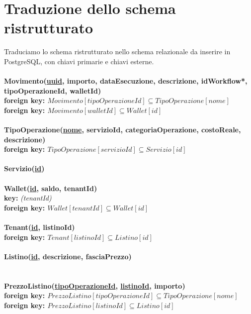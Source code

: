 \section{Traduzione dello schema ristrutturato}
Traduciamo lo schema ristrutturato nello schema relazionale da inserire in PostgreSQL, con chiavi primarie e chiavi esterne.
\\\\
\textbf{Movimento(\underline{uuid}, importo, dataEsecuzione, descrizione, idWorkflow*, tipoOperazioneId, walletId) \\}
\textbf{\hspace*{1.5 cm} foreign key: $ Movimento[tipoOperazioneId] \subseteq TipoOperazione[nome] $} \\
\textbf{\hspace*{1.5 cm} foreign key: $ Movimento[walletId] \subseteq Wallet[id] $ }
\\\\
\textbf{TipoOperazione(\underline{nome}, servizioId, categoriaOperazione, costoReale, descrizione) \\}
\textbf{\hspace*{1.5 cm} foreign key: $ TipoOperazione[servizioId] \subseteq Servizio[id] $}
\\\\
\textbf{Servizio(\underline{id})}
\\\\
\textbf{Wallet(\underline{id}, saldo, tenantId) \\}
\textbf{\hspace*{1.5 cm} key:} \textit{(tenantId)} \\
\textbf{\hspace*{1.5 cm} foreign key: $ Wallet[tenantId] \subseteq Wallet[id] $}
\\\\
\textbf{Tenant(\underline{id}, listinoId) \\}
\textbf{\hspace*{1.5 cm} foreign key: $ Tenant[listinoId] \subseteq Listino[id] $}
\\\\
\textbf{Listino(\underline{id}, descrizione, fasciaPrezzo) \\}
\\\\
\textbf{PrezzoListino(\underline{tipoOperazioneId}, \underline{listinoId}, importo) \\}
\textbf{\hspace*{1.5 cm} foreign key: $ PrezzoListino[tipoOperazioneId] \subseteq TipoOperazione[nome] $} \\
\textbf{\hspace*{1.5 cm} foreign key: $ PrezzoListino[listinoId] \subseteq Listino[id] $}

